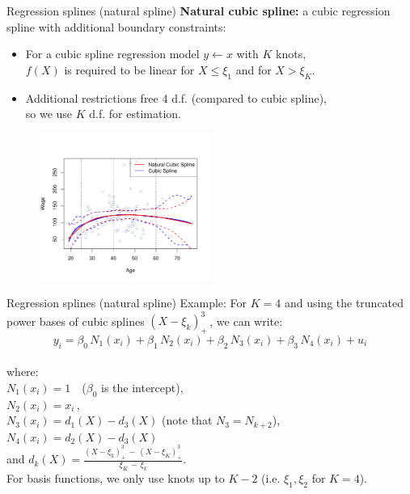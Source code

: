 \documentclass{beamer}
\begin{document}
\begin{frame}{Regression splines (natural spline)}
\textbf{Natural cubic spline:} a cubic regression spline with additional boundary constraints:\\
\smallskip
\begin{itemize}
    \item For a cubic spline regression model $y \leftarrow x$ with $K$ knots, \\$f(X)$ is required to be linear for $X \leq \xi_1$ and for $X > \xi_K$.
    \smallskip
    \item Additional restrictions free 4 d.f. (compared to cubic spline), \\so we use $K$ d.f. for estimation.
\end{itemize}
\vspace{-0.4cm}
\begin{figure}
  \centering
  \includegraphics[trim=0cm 0cm 0cm 1cm, clip=true, width=0.5\textwidth]{IMG/ISLR74.pdf}
\end{figure}
\end{frame}
\begin{frame}{Regression splines (natural spline)}
Example: For $K\!=\!4$ and using the truncated power bases of cubic splines $(X-\xi_k)_{+}^3 \,$, we can write:
$$y_i = \beta_0 \, N_1 (x_i)  + \beta_1 \, N_2 (x_i) + \beta_2 \, N_3 (x_i) + \beta_3 \, N_4 (x_i) + u_i  $$\\
\vspace{-0.2cm}
where:\\
\smallskip
\qquad $N_1 (x_i) = 1$\, \hspace{3.5cm} ~($\beta_0$ is the intercept),\\
\smallskip
\qquad $N_2 (x_i) = x_i$\,,\\
\smallskip
\qquad $N_3 (x_i) = d_1(X)-d_{3}(X)$ \qquad \qquad (note that $N_3=N_{k+2}$),\\
\smallskip
\qquad $N_4 (x_i) = d_2(X)-d_{3}(X)$\\
\medskip
\qquad and $d_k(X)=\frac{(X-\xi_k)_{+}^3 \,-\, (X-\xi_K)_{+}^3}{\xi_K \,-\, \xi_k}$.\\
\bigskip
For basis functions, we only use knots up to $K\!-\!2$ (i.e. $\xi_1, \xi_2$ for $K\!=\!4$).
\end{frame}
\end{document}
